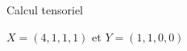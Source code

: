\begin{exo}[PC][1][appli]{Calcul tensoriel}
\begin{quest}
\begin{enonce}
  $X=(4,1,1,1)$ et $Y=(1,1,0,0)$
\end{enonce}
\end{quest}
\end{exo}



